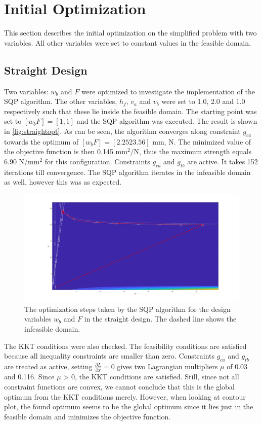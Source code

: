\section{Initial Optimization}
This section describes the initial optimization on the simplified problem with two variables. All other variables were set to constant values in the feasible domain. 
\subsection{Straight Design}
Two variables: $w_b$ and $F$ were optimized to investigate the implementation of the SQP algorithm. The other variables, $h_f$, $v_a$ and $v_b$ were set to 1.0, 2.0 and 1.0 respectively such that these lie inside the feasible domain. The starting point was set to $[w_b F] = [1, 1]$ and the SQP algorithm was executed. The result is shown in \autoref{fig:straightopt}. As can be seen, the algorithm converges along constraint $g_{ca}$ towards the optimum of $[w_b F] = [2.25 23.56]$ mm, N. The minimized value of the objective function is then 0.145 mm$^2$/N, thus the maximum strength equals 6.90 N/mm$^2$ for this configuration. Constraints $g_{ca}$ and $g_{tb}$ are active. It takes 152 iterations till convergence. The SQP algorithm iterates in the infeasible domain as well, however this was as expected.


\begin{figure}[H]
	\centering
	\includegraphics[width=\columnwidth]{sources/plots/straight2var.png}
	\caption{The optimization steps taken by the SQP algorithm for the design variables $w_b$ and $F$ in the straight design. The dashed line shows the infeasible domain.}
	\label{fig:straightopt}
\end{figure}


The KKT conditions were also checked. The feasibility conditions are satisfied because all inequality constraints are smaller than zero. Constraints $g_{ca}$ and $g_{tb}$ are treated as active, setting $\frac{\partial L}{\partial x} = 0$ gives two Lagrangian multipliers $\mu$ of 0.03 and 0.116. Since $\mu$ > 0, the KKT conditions are satisfied. Still, since not all constraint functions are convex, we cannot conclude that this is the global optimum from the KKT conditions merely. However, when looking at contour plot, the found optimum seems to be the global optimum since it lies just in the feasible domain and minimizes the objective function. 


